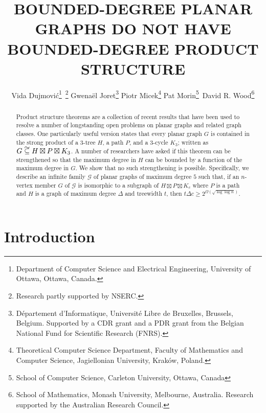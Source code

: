 \documentclass{patmorin}
\title{\MakeUppercase{Bounded-Degree Planar Graphs Do Not Have Bounded-Degree Product Structure}}
\author{%
  Vida Dujmović\thanks{Department of Computer Science and Electrical Engineering, University of Ottawa, Ottawa, Canada.}\, \thanks{Research partly supported by NSERC.} \quad
  Gwenaël Joret\thanks{D\'epartement d'Informatique, Universit\'e Libre de Bruxelles, Brussels, Belgium.
  Supported by a CDR grant and a PDR grant from the Belgian National Fund for Scientific Research (FNRS).} \quad
  Piotr Micek\thanks{Theoretical Computer Science Department, Faculty of Mathematics and Computer Science, Jagiellonian University, Krak\'ow, Poland.}\quad
  Pat Morin\thanks{School of Computer Science, Carleton University, Ottawa, Canada}\, \footnotemark[2] \quad
  David R. Wood\thanks{School of Mathematics, Monash University, Melbourne, Australia.
  Research supported by the Australian Research Council.}
}
\date{}
\newcommand\subsetcong{\mathrel{\text{%
    \setbox0\hbox{$\subseteq$}%
    \rlap{\hbox to \wd0{\hss\hss\hss\raisebox{1.5\height}{$\sim$}\hss}}\box0
}}}
\renewcommand{\ge}{\geqslant}
\begin{document}
\maketitle


\begin{abstract}
   Product structure theorems are a collection of recent results that have been used to resolve a number of longstanding open problems on planar graphs and related graph classes.  One particularly useful version states that every planar graph $G$ is contained in the strong product of a $3$-tree $H$, a path $P$, and a $3$-cycle $K_3$; written as $G\subsetcong H\boxtimes P\boxtimes K_3$.  A number of researchers have asked if this theorem can be strengthened so that the maximum degree in $H$ can be bounded by a function of the maximum degree in $G$.  We show that no such strengthening is possible.  Specifically, we describe an infinite family $\mathcal{G}$ of planar graphs of maximum degree $5$ such that, if an $n$-vertex member $G$ of $\mathcal{G}$ is isomorphic to a subgraph of $H\boxtimes P\boxtimes K_c$ where $P$ is a path and $H$ is a graph of maximum degree $\Delta$ and treewidth $t$, then $t\Delta c \ge 2^{\Omega(\sqrt{\log\log n})}$.
\end{abstract}

\section{Introduction}
\end{document}
